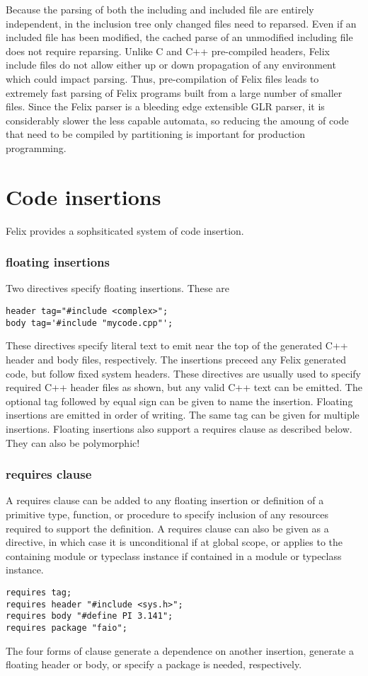 \documentclass{report}
\begin{document}
Because the parsing of both the including and included file are
entirely independent, in the inclusion tree only changed files
need to reparsed. Even if an included file has been
modified, the cached parse of an unmodified including file
does not require reparsing. Unlike C and C++ pre-compiled headers,
Felix include files do not allow either up or down propagation
of any environment which could impact parsing. Thus, pre-compilation
of Felix files leads to extremely fast parsing of Felix programs
built from a large number of smaller files. Since the Felix parser
is a bleeding edge extensible GLR parser, it is considerably slower
the less capable automata, so reducing the amoung of code that
need to be compiled by partitioning is important for production
programming.

\chapter{Code insertions}
Felix provides a sophsiticated system of code insertion.
\subsection{floating insertions}
Two directives specify floating insertions. These are
\begin{verbatim}
header tag="#include <complex>";
body tag='#include "mycode.cpp"';
\end{verbatim}
%
These directives specify literal text to emit near the top
of the generated C++ header and body files, respectively.
The insertions preceed any Felix generated code, but follow
fixed system headers. These directives are usually used to 
specify required C++ header files as shown, but any valid
C++ text can be emitted. The optional tag followed by equal sign
can be given to name the insertion. 
%
Floating insertions are emitted in order of writing. The same tag
can be given for multiple insertions.
%
Floating insertions also support a requires clause as described below.
They can also be polymorphic!

\subsection{requires clause}
A requires clause can be added to any floating insertion or
definition of a primitive type, function, or procedure
to specify inclusion of any
resources required to support the definition. A requires clause
can also be given as a directive, in which case it is unconditional
if at global scope, or applies to the containing module or typeclass
instance if contained in a module or typeclass instance.
\begin{verbatim}
requires tag;
requires header "#include <sys.h>";
requires body "#define PI 3.141";
requires package "faio";
\end{verbatim}
The four forms of clause generate a dependence on another
insertion, generate a floating header or body, or specify
a package is needed, respectively.
\end{document}
